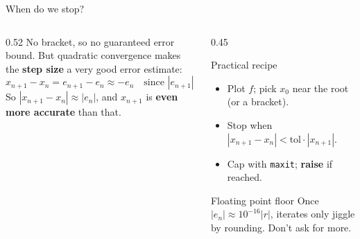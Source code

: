 \documentclass[aspectratio=169]{beamer}
\begin{document}
\begin{frame}{When do we stop?}
\begin{columns}[T]
\begin{column}{0.52\textwidth}
\small
No bracket, so no guaranteed error bound. But quadratic convergence makes the \textbf{step size} a very good error estimate:
\[
x_{n+1} - x_n = e_{n+1} - e_n \approx -e_n
\quad\text{since } |e_{n+1}| \ll |e_n|.
\]
So $|x_{n+1} - x_n| \approx |e_n|$, and $x_{n+1}$ is \textbf{even more accurate} than that.
\end{column}
\begin{column}{0.45\textwidth}
\begin{exampleblock}{Practical recipe}
\small
\begin{itemize}
  \item Plot $f$; pick $x_0$ near the root (or a bracket).
  \item Stop when $|x_{n+1} - x_n| < \text{tol}\cdot|x_{n+1}|$.
  \item Cap with \texttt{maxit}; \textbf{raise} if reached.
\end{itemize}
\end{exampleblock}
\begin{alertblock}{Floating point floor}
\scriptsize Once $|e_n| \approx 10^{-16}|r|$, iterates only jiggle by rounding. Don't ask for more.
\end{alertblock}
\end{column}
\end{columns}
\end{frame}
\end{document}

